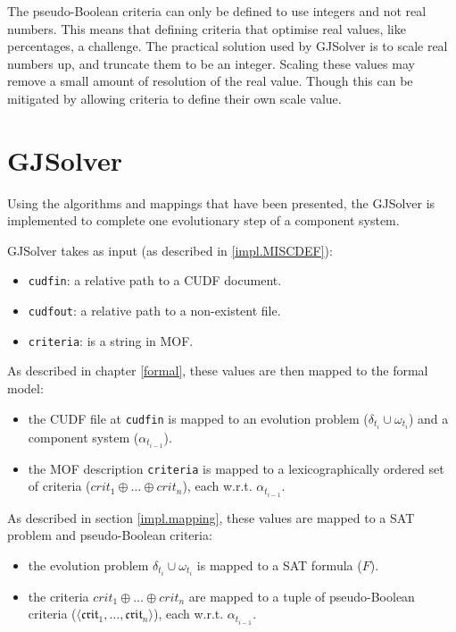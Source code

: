 The pseudo-Boolean criteria can only be defined to use integers and not real numbers.
This means that defining criteria that optimise real values, like percentages, a challenge.
The practical solution used by GJSolver is to scale real numbers up, and truncate them to be an integer.
Scaling these values may remove a small amount of resolution of the real value.
Though this can be mitigated by allowing criteria to define their own scale value.

\section{GJSolver}
\label{impl.gjsolver}
Using the algorithms and mappings that have been presented,
the GJSolver is implemented to complete one evolutionary step of a component system.

GJSolver takes as input (as described in \ref{impl.MISCDEF}):
\begin{itemize}
  \item \verb+cudfin+: a relative path to a CUDF document.
  \item \verb+cudfout+: a relative path to a non-existent file.
  \item \verb+criteria+: is a string in MOF. 
\end{itemize}

As described in chapter \ref{formal}, these values are then mapped to the formal model:
\begin{itemize}
  \item the CUDF file at \verb+cudfin+ is mapped to an evolution problem ($\delta_{t_i} \cup \omega_{t_i}$) and a component system ($\alpha_{t_{i-1}}$).
  \item the MOF description \verb+criteria+ is mapped to a lexicographically ordered set of criteria ($crit_1 \oplus \ldots \oplus crit_n$), each w.r.t. $\alpha_{t_{i-1}}$.
\end{itemize}

As described in section \ref{impl.mapping}, these values are mapped to a SAT problem and pseudo-Boolean criteria:
\begin{itemize}
  \item the evolution problem $\delta_{t_i} \cup \omega_{t_i}$ is mapped to a SAT formula ($F$).
  \item the criteria $crit_1 \oplus \ldots \oplus crit_n$ are mapped to a tuple of pseudo-Boolean criteria ($\langle \mathfrak{crit}_1, \ldots ,\mathfrak{crit}_n \rangle$), each w.r.t. $\alpha_{t_{i-1}}$. 
\end{itemize}


